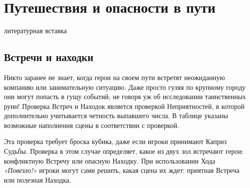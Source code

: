 \chapter{Путешествия и опасности в пути}
\tbd литературная вставка

\section{Встречи и находки}
Никто заранее не знает, когда герои на своем пути встретят неожиданную компанию или занимательную ситуацию. Даже просто гуляя по крупному городу они могут попасть в гущу событий, не говоря уж об исследовании таинственных руин!
\newline Проверка Встреч и Находок является проверкой Неприятностей, в которой дополнительно учитывается четность выпавшего числа. В таблице указаны возможные наполнения сцены в соответствии с проверкой.

\begin{tcolorbox}
Эта проверка требует броска кубика, даже если игроки принимают Каприз Судьбы. Проверка в этом случае определяет, какое из двух зол встречают герои: конфликтную Встречу или опасную Находку.
\newline При использовании Хода \textit{«Повезло!»} игроки могут сами решить, какая сцена их ждет: приятная Встреча или полезная Находка.
\end{tcolorbox}

